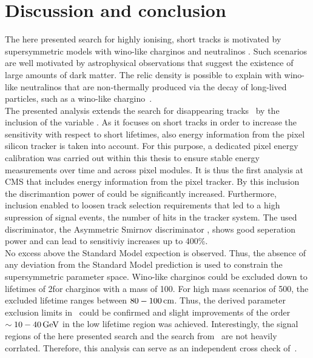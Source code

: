 \chapter{Discussion and conclusion}
\label{sec:Discussion}

The here presented search for highly ionising, short tracks is motivated by supersymmetric models with wino-like charginos \chipm and neutralinos \chiO.
Such scenarios are well motivated by astrophysical observations that suggest the existence of large amounts of dark matter.
The relic density is possible to explain with wino-like neutralinos that are non-thermally produced via the decay of long-lived particles, such as a wino-like chargino~\cite{}.\\

The presented analysis extends the search for disappearing tracks~\cite{bib:CMS:DT_8TeV} by the inclusion of the variable \dedx.
As it focuses on short tracks in order to increase the sensitivity with respect to short lifetimes, also energy information from the pixel silicon tracker is taken into account.
For this purpose, a dedicated pixel energy calibration was carried out within this thesis to ensure stable energy measurements over time and across pixel modules.
It is thus the first analysis at CMS that includes energy information from the pixel tracker.
By this inclusion the discrimantion power of \dedx could be significantly increased.
Furthermore, \dedx inclusion enabled to loosen track selection requirements that led to a high supression of signal events, the number of hits in the tracker system.
The used \dedx discriminator, the Asymmetric Smirnov discriminator \ias, shows good seperation power and can lead to sensitiviy increases up to 400\%.\\

No excess above the Standard Model expection is observed.
Thus, the absence of any deviation from the Standard Model prediction is used to constrain the supersymmetric parameter space.
Wino-like charginos could be excluded down to lifetimes of 2\cm for charginos with a mass of 100\gev.
For high mass scenarios of 500\gev, the excluded lifetime ranges between $80-100\,\text{cm}$.
Thus, the derived parameter exclusion limits in~\cite{bib:CMS:DT_8TeV} could be confirmed and slight improvements of the order $\sim 10-40\,\text{Ge}\kern-0.06667em\text{V}$ in the low lifetime region was achieved.
Interestingly, the signal regions of the here presented search and the search from~\cite{bib:CMS:DT_8TeV} are not heavily corrlated.
Therefore, this analysis can serve as an independent cross check of~\cite{bib:CMS:DT_8TeV}.\\

